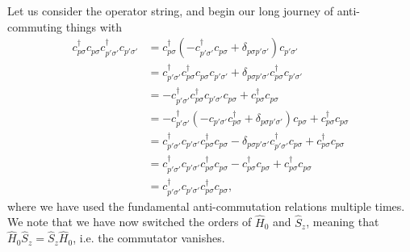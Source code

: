 \documentclass[a4paper]{article}
\newcommand{\nn}{\nonumber}
\newcommand{\ps}{{p\sigma}}
\begin{document}
Let us consider the operator string, and begin our long journey of anti-commuting things with
\begin{align}
c_\ps^\dagger c_\ps  c_{p'\sigma'}^\dagger c_{p'\sigma'} &= c_\ps^\dagger (-c_{p'\sigma'}^\dagger c_\ps   + \delta_{p\sigma p'\sigma'}) c_{p'\sigma'} \nn\\
%
&= c_{p'\sigma'}^\dagger c_\ps^\dagger  c_\ps c_{p'\sigma'}   + \delta_{p\sigma p'\sigma'}c_\ps^\dagger c_{p'\sigma'} \nn\\
%
&= -c_{p'\sigma'}^\dagger c_\ps^\dagger c_{p'\sigma'} c_\ps    + c_\ps^\dagger c_{p\sigma} \nn\\
%
&= -c_{p'\sigma'}^\dagger (- c_{p'\sigma'}c_\ps^\dagger + \delta_{p\sigma p'\sigma'}) c_\ps    + c_\ps^\dagger c_{p\sigma} \nn\\
%
&= c_{p'\sigma'}^\dagger c_{p'\sigma'}c_\ps^\dagger c_\ps -   \delta_{p\sigma p'\sigma'} c_{p'\sigma'}^\dagger c_\ps   + c_\ps^\dagger c_{p\sigma} \nn\\
%
&= c_{p'\sigma'}^\dagger c_{p'\sigma'}c_\ps^\dagger c_\ps -   c_{p\sigma}^\dagger c_\ps   + c_\ps^\dagger c_{p\sigma} \nn\\
%
&= c_{p'\sigma'}^\dagger c_{p'\sigma'}c_\ps^\dagger c_\ps,
\end{align}
where we have used the fundamental anti-commutation relations multiple times. We note that we have now switched the orders of $\hat H_0$ and $\hat S_z$, meaning that $\hat H_0 \hat S_z = \hat S_z \hat H_0$, i.e. the commutator vanishes.
\end{document}
